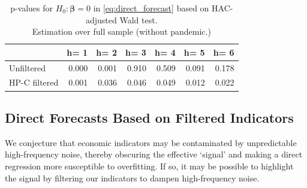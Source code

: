 \documentclass[11pt,a4paper]{article}
\begin{document}
\bigskip
\begin{table}[h]
\centering
\begin{tabular}{lrrrrrr}
  \hline
  & h= 1 & h= 2 & h= 3 & h= 4 & h= 5 & h= 6 \\ 
  \hline
  Unfiltered & 0.000 & 0.001 & 0.910 & 0.509 & 0.091 & 0.178 \\ 
HP-C filtered & 0.001 & 0.036 & 0.046 & 0.049 & 0.012 & 0.022 \\ 
   \hline
\end{tabular}
\caption{p-values for $H_0: \boldsymbol{\beta} = 0$ in \ref{eq:direct_forecast} based on HAC-adjusted Wald test.\\Estimation over full sample (without pandemic.)} 
\label{tab:pvaluedhp}
\end{table}





\subsection{Direct Forecasts Based on Filtered Indicators}\label{hpdf}

We conjecture that economic indicators may be contaminated by unpredictable high-frequency noise, thereby obscuring the effective `signal' and making a direct regression more susceptible to overfitting. If so, it may be possible to highlight the signal by filtering our indicators to dampen high-frequency noise. 
\end{document}
